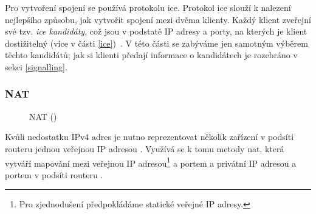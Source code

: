 Pro vytvoření spojení se používá protokolu \gls{ice}. Protokol \gls{ice} slouží
k nalezení nejlepšího způsobu, jak vytvořit spojení mezi dvěma klienty. Každý
klient zveřejní své tzv. \textit{\gls{ice} kandidáty}, což jsou v podstatě IP
adresy a porty, na kterých je klient dostižitelný (více v části
\ref{ice})~\parencite{WebRTCForTheCurious}. V této části se zabýváme jen
samotným výběrem těchto kandidátů; jak si klienti předají informace o
kandidátech je rozebráno v sekci \ref{signalling}.

\subsubsection{NAT}\label{nat}

\begin{figure}[H]
    \centering
    \caption{NAT (\publicPrivateIP)}
    \label{natFig}
\end{figure}

Kvůli nedostatku IPv4 adres je nutno reprezentovat několik zařízení v podsíti
routeru jednou veřejnou IP adresou \parencite{Medium-NATWHyWeNeedIt}. Využívá se
k tomu metody \gls{nat}, která vytváří mapování mezi veřejnou IP
adresou\footnote{Pro zjednodušení předpokládáme statické veřejné IP adresy.} a
portem a privátní IP adresou a portem v podsíti routeru
\parencite{WebRTCForTheCurious}.

